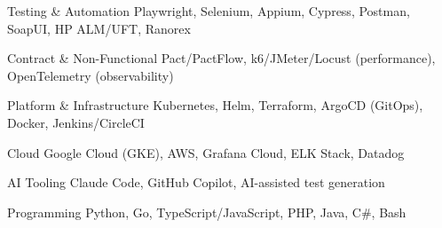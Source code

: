 
\begin{cvskills}

	\cvskill
	{Testing \& Automation}
    {Playwright, Selenium, Appium, Cypress, Postman, SoapUI, HP ALM/UFT, Ranorex}

	\cvskill
	{Contract \& Non-Functional}
    {Pact/PactFlow, k6/JMeter/Locust (performance), OpenTelemetry (observability)}

    \cvskill
	{Platform \& Infrastructure}
    {Kubernetes, Helm, Terraform, ArgoCD (GitOps), Docker, Jenkins/CircleCI}

	\cvskill
    {Cloud}
    {Google Cloud (GKE), AWS, Grafana Cloud, ELK Stack, Datadog}

    \cvskill
	{AI Tooling}
    {Claude Code, GitHub Copilot, AI-assisted test generation}

	\cvskill
	{Programming}
    {Python, Go, TypeScript/JavaScript, PHP, Java, C\#, Bash}

\end{cvskills}
